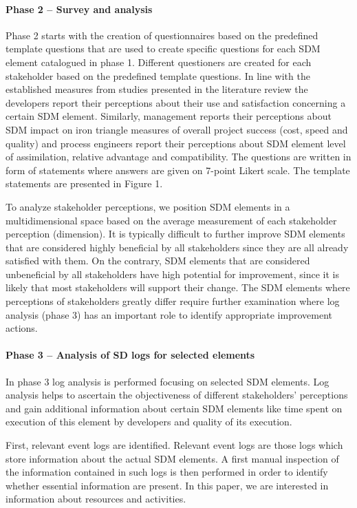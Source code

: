 \paragraph{Phase 2 – Survey and analysis }

Phase 2 starts with the creation of questionnaires based on the predefined template questions that are used to create specific questions for each SDM element catalogued in phase 1. Different questioners are created for each stakeholder based on the predefined template questions. In line with the established measures from studies presented in the literature review the developers report their perceptions about their use and satisfaction concerning a certain SDM element. Similarly, management reports their perceptions about SDM impact on iron triangle measures of overall project success (cost, speed and quality) and process engineers report their perceptions about SDM element level of assimilation, relative advantage and compatibility. The questions are written in form of statements where answers are given on 7-point Likert scale. The template statements are presented in Figure 1. 

To analyze stakeholder perceptions, we position SDM elements in a multidimensional space based on the average measurement of each stakeholder perception (dimension). It is typically difficult to further improve SDM elements that are considered highly beneficial by all stakeholders since they are all already satisfied with them. On the contrary, SDM elements that are considered unbeneficial by all stakeholders have high potential for improvement, since it is likely that most stakeholders will support their change. The SDM elements where perceptions of stakeholders greatly differ require further examination where log analysis (phase 3) has an important role to identify appropriate improvement actions. 

\paragraph{Phase 3 – Analysis of SD logs for selected elements }

In phase 3 log analysis is performed focusing on selected SDM elements. Log analysis helps to ascertain the objectiveness of different stakeholders’ perceptions and gain additional information about certain SDM elements like time spent on execution of this element by developers and quality of its execution.  

First, relevant event logs are identified. Relevant event logs are those logs which store information about the actual SDM elements. A first manual inspection of the information contained in such logs is then performed in order to identify whether essential information are present. In this paper, we are interested in information about resources and activities.  


